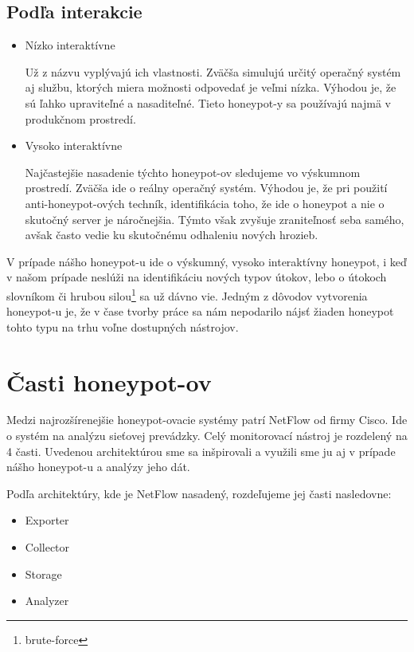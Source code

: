 \documentclass[12pt, oneside]{book}
\begin{document}
\subsection{Podľa interakcie}

\begin{itemize}
\item{Nízko interaktívne}

Už z názvu vyplývajú ich vlastnosti.
Zväčša simulujú určitý operačný systém aj službu, ktorých miera možnosti odpovedať je veľmi nízka.
Výhodou je, že sú ľahko upraviteľné a nasaditeľné.
Tieto honeypot-y sa používajú najmä v produkčnom prostredí. 
\\
\item{Vysoko interaktívne}

Najčastejšie nasadenie týchto honeypot-ov sledujeme vo výskumnom prostredí.
Zväčša ide o reálny operačný systém.
Výhodou je, že pri použití anti-honeypot-ových techník, identifikácia toho, že ide o honeypot a nie o skutočný server je náročnejšia.
Týmto však zvyšuje zraniteľnosť seba samého, avšak často vedie ku skutočnému odhaleniu nových hrozieb.

\end{itemize}

V prípade nášho honeypot-u ide o výskumný, vysoko interaktívny honeypot, i keď v našom prípade neslúži na identifikáciu nových typov útokov, lebo o útokoch slovníkom či hrubou silou\footnote{brute-force} sa už dávno vie.
Jedným z dôvodov vytvorenia honeypot-u je, že v čase tvorby práce sa nám nepodarilo nájsť žiaden honeypot tohto typu na trhu voľne dostupných nástrojov.


\section{Časti honeypot-ov}

Medzi najrozšírenejšie honeypot-ovacie systémy patrí NetFlow od firmy Cisco.
Ide o systém na analýzu sieťovej prevádzky.
Celý monitorovací nástroj je rozdelený na 4 časti.
Uvedenou architektúrou sme sa inšpirovali a využili sme ju aj v prípade nášho honeypot-u a analýzy jeho dát.

Podľa architektúry, kde je NetFlow nasadený, rozdeľujeme jej časti nasledovne: 

\begin{itemize}
\item Exporter
\item Collector
\item Storage
\item Analyzer
\end{itemize}
\end{document}
